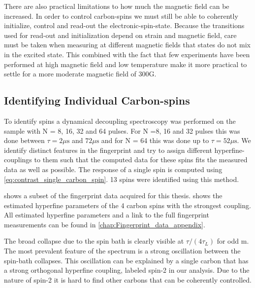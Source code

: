 There are also practical limitations to how much the magnetic field can be increased. In order to control carbon-spins we must still be able to coherently initialize, control and read-out the electronic-spin-state. Because the transitions used for read-out and initialization depend on strain and magnetic field\citep{Hensen2011MeasurementBased}, care must be taken when measuring at different magnetic fields that states do not mix in the excited state.
This combined with the fact that few experiments have been performed at high magnetic field and low temperature make it more practical to settle for a more moderate magnetic field of 300G.


\subsection*{Identifying Individual Carbon-spins}
To identify spins a dynamical decoupling spectroscopy was performed on the sample with N = 8, 16, 32 and 64 pulses. For N =8, 16 and 32 pulses this was done between $\tau = 2 \mu \mathrm{s}$  and $72 \mu \mathrm{s}$ and for N = 64 this was done up to $\tau = 52 \mu \mathrm{s}$.
We identify distinct features in the fingerprint and try to assign different hyperfine-couplings to them such that the computed data for these spins fits the measured data as well as possible.
The response of a single spin is computed using \cref{eq:contrast_single_carbon_spin}.
13 spins were identified using this method.

 shows a subset of the fingerprint data acquired for this thesis.  shows the estimated hyperfine parameters of the 4 carbon spins with the strongest coupling.
All estimated hyperfine parameters and a link to the full fingerprint measurements can be found in \cref{chap:Fingerprint_data_appendix}.

The broad collapse due to the spin bath is clearly visible at $\tau/(4 \tau _L)$ for odd m.
The most prevalent feature of the spectrum is a strong oscillation between the spin-bath collapses.
This oscillation can be explained by a single carbon that has a strong orthogonal hyperfine coupling, labeled spin-2 in our analysis.
Due to the nature of spin-2 it is hard to find other carbons that can be coherently controlled.

